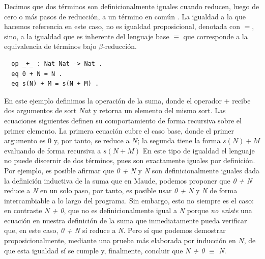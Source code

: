 \begin{definition} Decimos que dos términos son definicionalmente iguales cuando reducen, luego de cero o más pasos de reducción, a un término en común \citep{mimram2020}. La igualdad a la que hacemos referencia en este caso, no es igualdad proposicional, denotada con $=$, sino, a la igualdad que es inherente del lenguaje base $\equiv$ que corresponde a la equivalencia de términos bajo $\beta$-reducción.
\begin{lstlisting}
  op _+_ : Nat Nat -> Nat .
  eq 0 + N = N .
  eq s(N) + M = s(N + M) .
\end{lstlisting}

En este ejemplo definimos la operación de la suma, donde el operador $+$ recibe dos argumentos de sort $Nat$ y retorna un elemento del mismo sort. Las ecuaciones siguientes definen su comportamiento de forma recursiva sobre el primer elemento. La primera ecuación cubre el caso base, donde el primer argumento es 0 y, por tanto, se reduce a $N$; la segunda tiene la forma $s(N) + M$ evaluando de forma recursiva a $s(N + M)$
En este tipo de igualdad el lenguaje no puede discernir de dos términos, pues son exactamente iguales por definición. Por ejemplo, es posible afirmar que \textit{0 + N} y \textit{N} son definicionalmente iguales dada la definición inductiva de la suma que en Maude, podemos proponer que \textit{0 + N} reduce a \textit{N} en un  solo paso, por tanto, es posible usar \textit{0 + N} y \textit{N}  de forma intercambiable a lo largo del programa.
\newline
\newline
\indent Sin embargo, esto no siempre es el caso: en contraste \textit{N + 0}, que no es definicionalmente igual a \textit{N} porque \textit{no existe} una ecuación en nuestra definición de la suma que inmediatamente pueda verificar que, en este caso, \textit{0 + N} sí reduce a \textit{N}. Pero sí que podemos demostrar proposicionalmente, mediante una prueba más elaborada por inducción en $N$, de que esta igualdad sí se cumple y, finalmente, concluir que \textit{N + 0} $\equiv$ \textit{N}.
\end{definition}

